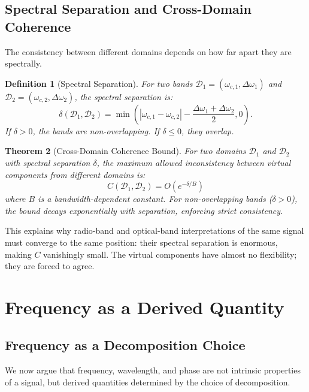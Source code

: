 \documentclass[twocolumn,11pt,a4paper]{article}
\newtheorem{theorem}{Theorem}[section]
\newtheorem{definition}[theorem]{Definition}
\newcommand{\bandwidth}{\Delta\omega}
\newcommand{\domain}{\mathcal{D}}
\newcommand{\freq}{\omega}
\begin{document}
\subsection{Spectral Separation and Cross-Domain Coherence}

The consistency between different domains depends on how far apart they are spectrally.

\begin{definition}[Spectral Separation]
For two bands $\domain_1 = (\freq_{c,1}, \bandwidth_1)$ and $\domain_2 = (\freq_{c,2}, \bandwidth_2)$, the \emph{spectral separation} is:
\begin{equation}
  \delta(\domain_1, \domain_2) = \min\left( |\freq_{c,1} - \freq_{c,2}| - \frac{\bandwidth_1 + \bandwidth_2}{2}, 0 \right).
\end{equation}
If $\delta > 0$, the bands are non-overlapping. If $\delta \leq 0$, they overlap.
\end{definition}

\begin{theorem}[Cross-Domain Coherence Bound]
For two domains $\domain_1$ and $\domain_2$ with spectral separation $\delta$, the maximum allowed inconsistency between virtual components from different domains is:
\begin{equation}
  C(\domain_1, \domain_2) = O(e^{-\delta / B})
\end{equation}
where $B$ is a bandwidth-dependent constant. For non-overlapping bands ($\delta > 0$), the bound decays exponentially with separation, enforcing strict consistency.
\end{theorem}

This explains why radio-band and optical-band interpretations of the same signal must converge to the same position: their spectral separation is enormous, making $C$ vanishingly small. The virtual components have almost no flexibility; they are forced to agree.

\section{Frequency as a Derived Quantity}
\label{sec:frequency_derived}

\subsection{Frequency as a Decomposition Choice}

We now argue that frequency, wavelength, and phase are not intrinsic properties of a signal, but derived quantities determined by the choice of decomposition.
\end{document}
